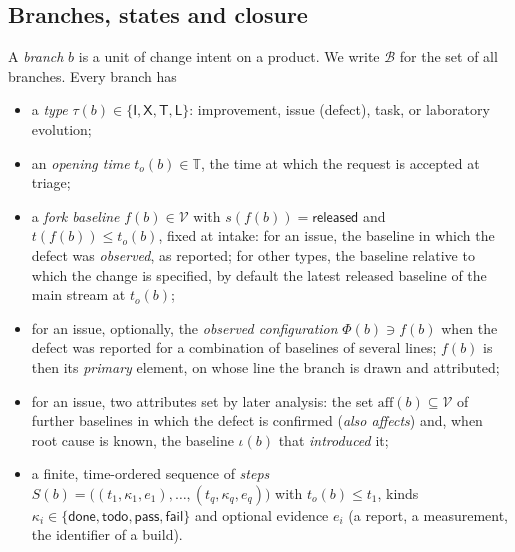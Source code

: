 \subsection{Branches, states and closure}
\label{app:formal-branches}

\begin{definition}[Branch]
  \label{def:branch}
  A \emph{branch} $b$ is a unit of change intent on a product. We write
  $\mathcal{B}$ for the set of all branches. Every branch has
  \begin{itemize}[leftmargin=1.5em,itemsep=1pt,topsep=2pt]
    \item a \emph{type} $\tau(b) \in \{\mathsf{I}, \mathsf{X}, \mathsf{T},
          \mathsf{L}\}$: improvement, issue (defect), task, or laboratory
          evolution;
    \item an \emph{opening time} $t_o(b) \in \mathbb{T}$, the time at which
          the request is accepted at triage;
    \item a \emph{fork baseline} $f(b) \in \mathcal{V}$ with
          $s(f(b)) = \textsf{released}$ and $t(f(b)) \le t_o(b)$, fixed at
          intake: for an issue, the baseline in which the defect was
          \emph{observed}, as reported; for other types, the baseline
          relative to which the change is specified, by default the latest
          released baseline of the main stream at $t_o(b)$;
    \item for an issue, optionally, the \emph{observed configuration}
          $\Phi(b) \ni f(b)$ when the defect was reported for a combination
          of baselines of several lines; $f(b)$ is then its \emph{primary}
          element, on whose line the branch is drawn and attributed;
    \item for an issue, two attributes set by later analysis: the set
          $\mathrm{aff}(b) \subseteq \mathcal{V}$ of further baselines in
          which the defect is confirmed (\emph{also affects}) and, when root
          cause is known, the baseline $\iota(b)$ that \emph{introduced} it;
    \item a finite, time-ordered sequence of \emph{steps}
          $S(b) = \big((t_1, \kappa_1, e_1), \dots, (t_q, \kappa_q, e_q)\big)$
          with $t_o(b) \le t_1$, kinds
          $\kappa_i \in \{\textsf{done}, \textsf{todo}, \textsf{pass},
          \textsf{fail}\}$ and optional evidence $e_i$ (a report, a
          measurement, the identifier of a build).
  \end{itemize}
\end{definition}

